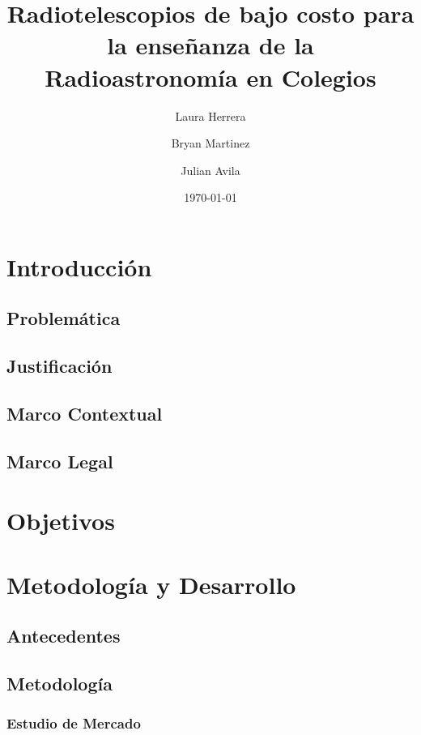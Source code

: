 \documentclass[sn-mathphys]{svmono}
\title{\Huge \textbf{Radiotelescopios de bajo costo para la enseñanza de la Radioastronomía en Colegios}}
\author{Laura Herrera \and Bryan Martinez \and Julian Avila}
\date{\today}
\begin{document}
\maketitle

\tableofcontents

\newpage

\chapter{Introducción}
\section{Problemática}


\section{Justificación}


\section{Marco Contextual}


\section{Marco Legal}


\chapter{Objetivos}


\chapter{Metodología y Desarrollo}

\section{Antecedentes}



\section{Metodología}



\subsection{Estudio de Mercado}%
\label{sub:Estudio de Mercado}



\printbibliography
\end{document}
